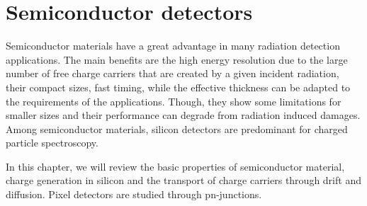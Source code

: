 \chapter{Semiconductor detectors}
\label{sec:SiliconTheory}

Semiconductor materials have a great advantage in many radiation
detection applications. The main benefits are the high energy
resolution due to the large number of free charge carriers that are
created by a given incident radiation, their compact sizes, fast
timing, while the effective thickness can be adapted to the
requirements of the applications. Though, they show some limitations
for smaller sizes and their performance can degrade from radiation
induced damages. Among semiconductor materials, silicon detectors are
predominant for charged particle spectroscopy.

In this chapter, we will review the basic properties of semiconductor
material, charge generation in silicon and the transport of charge
carriers through drift and diffusion. Pixel detectors are studied
through pn-junctions. 


